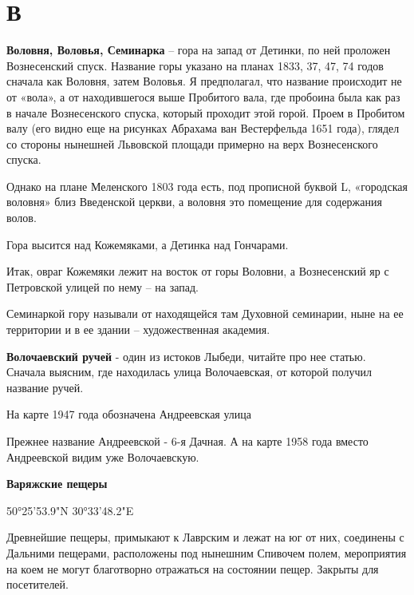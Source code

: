\chapter*{В}

\textbf{Воловня, Воловья, Семинарка} – гора на запад от Детинки, по ней проложен Вознесенский спуск. Название горы указано на планах 1833, 37, 47, 74 годов сначала как Воловня, затем Воловья. Я предполагал, что название происходит не от «вола», а от находившегося выше Пробитого вала, где пробоина была как раз в начале Вознесенского спуска, который проходит этой горой. Проем в Пробитом валу (его видно еще на рисунках Абрахама ван Вестерфельда 1651 года), глядел со стороны нынешней Львовской площади примерно на верх Вознесенского спуска. 

Однако на плане Меленского 1803 года есть, под прописной буквой L, «городская воловня» близ Введенской церкви, а воловня это помещение для содержания волов. 

Гора высится над Кожемяками, а Детинка над Гончарами. 

Итак, овраг Кожемяки лежит на восток от горы Воловни, а Вознесенский яр с Петровской улицей по нему – на запад.

Семинаркой гору называли от находящейся там Духовной семинарии, ныне на ее территории и в ее здании – художественная академия.\\

\medskip

\textbf{Волочаевский ручей} - один из истоков Лыбеди, читайте про нее статью.\\

Сначала выясним, где находилась улица Волочаевская, от которой получил название ручей.

На карте 1947 года обозначена Андреевская улица


Прежнее название Андреевской - 6-я Дачная. А на карте 1958 года вместо Андреевской видим уже Волочаевскую.



\medskip


\textbf{Варяжские пещеры}

50°25'53.9"N 30°33'48.2"E

Древнейшие пещеры, примыкают к Лаврским и лежат на юг от них, соединены с Дальними пещерами, расположены под нынешним Спивочем полем, мероприятия на коем не могут благотворно отражаться на состоянии пещер. Закрыты для посетителей.


